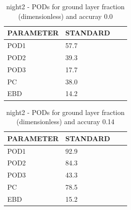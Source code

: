 \begin{table}[p!]
\begin{center}
\begin{tabular}{|l|l|l|l|}
\hline
\multicolumn{1}{|c|}{\cellcolor[HTML]{C0C0C0}\textbf{PARAMETER}} & \multicolumn{1}{c|}{\cellcolor[HTML]{C0C0C0}\textbf{STANDARD}} \\
\hline
\cellcolor[HTML]{C0C0C0}POD1  & 57.7                                \\
\cellcolor[HTML]{C0C0C0}POD2  & 39.3                                \\
\cellcolor[HTML]{C0C0C0}POD3  & 17.7                                \\
\cellcolor[HTML]{C0C0C0}PC    & 38.0                                  \\
\cellcolor[HTML]{C0C0C0}EBD   & 14.2                                 \\
\hline
\end{tabular}
\caption{night2 - PODs for ground layer fraction (dimensionless) and accuray 0.0}
\label{tab:podglf0.0:night2}
\end{center}
\end{table}
\begin{table}[p!]
\begin{center}
\begin{tabular}{|l|l|l|l|}
\hline
\multicolumn{1}{|c|}{\cellcolor[HTML]{C0C0C0}\textbf{PARAMETER}} & \multicolumn{1}{c|}{\cellcolor[HTML]{C0C0C0}\textbf{STANDARD}} \\
\hline
\cellcolor[HTML]{C0C0C0}POD1  & 92.9                                \\
\cellcolor[HTML]{C0C0C0}POD2  & 84.3                                \\
\cellcolor[HTML]{C0C0C0}POD3  & 43.3                                \\
\cellcolor[HTML]{C0C0C0}PC    & 78.5                                  \\
\cellcolor[HTML]{C0C0C0}EBD   & 15.2                                 \\
\hline
\end{tabular}
\caption{night2 - PODs for ground layer fraction (dimensionless) and accuray 0.14}
\label{tab:podglf0.14:night2}
\end{center}
\end{table}
